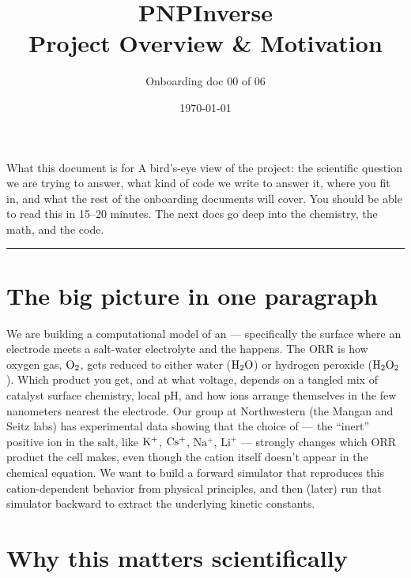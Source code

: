 \documentclass[11pt]{article}
\title{\bfseries PNPInverse \\
       \large Project Overview \& Motivation}
\author{Onboarding doc 00 of 06}
\date{\today}
\begin{document}
\maketitle

\begin{callout}{What this document is for}
A bird's-eye view of the project: the scientific question we are
trying to answer, what kind of code we write to answer it, where you
fit in, and what the rest of the onboarding documents will cover.
You should be able to read this in 15--20 minutes. The next docs go
deep into the chemistry, the math, and the code.
\end{callout}

\tableofcontents
\bigskip\hrule\bigskip

\section{The big picture in one paragraph}

We are building a computational model of an
 --- specifically the surface where an
electrode meets a salt-water electrolyte and the
 happens. The ORR is how
oxygen gas, $\mathrm{O_2}$, gets reduced to either water ($\mathrm{H_2O}$) or
hydrogen peroxide ($\mathrm{H_2O_2}$). Which product you get, and at what
voltage, depends on a tangled mix of catalyst surface chemistry,
local pH, and how ions arrange themselves in the few nanometers
nearest the electrode. Our group at Northwestern (the Mangan and
Seitz labs) has experimental data showing that the choice of
 --- the ``inert'' positive ion in the
salt, like $\mathrm{K^+}$, $\mathrm{Cs^+}$, $\mathrm{Na^+}$, $\mathrm{Li^+}$ ---
strongly changes which ORR product the cell makes, even though the
cation itself doesn't appear in the chemical equation. We want to
build a forward simulator that reproduces this cation-dependent
behavior from physical principles, and then (later) run that
simulator backward to extract the underlying kinetic constants.

\section{Why this matters scientifically}
\end{document}
